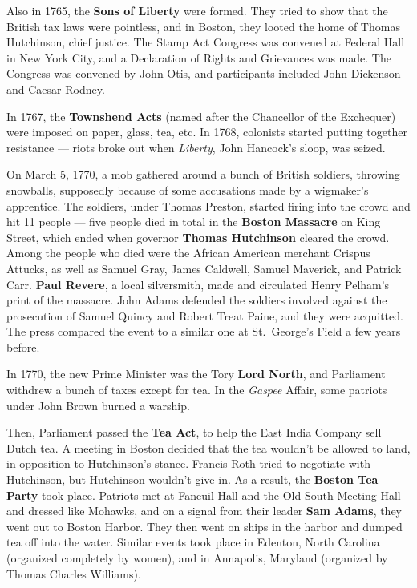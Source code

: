 Also in 1765, the \textbf{Sons of Liberty} were formed.
They tried to show that the British tax laws were pointless,
and in Boston, they looted the home of Thomas Hutchinson, chief justice.
The Stamp Act Congress was convened at Federal Hall in New York City,
and a Declaration of Rights and Grievances was made.
The Congress was convened by John Otis, and participants included John Dickenson and Caesar Rodney.

In 1767, the \textbf{Townshend Acts} (named after the Chancellor of the Exchequer)
were imposed on paper, glass, tea, etc.
In 1768, colonists started putting together resistance ---
riots broke out when \textit{Liberty}, John Hancock's sloop, was seized.

On March 5, 1770, a mob gathered around a bunch of British soldiers, throwing snowballs,
supposedly because of some accusations made by a wigmaker's apprentice.
The soldiers, under Thomas Preston, started firing into the crowd and hit 11 people ---
five people died in total in the \textbf{Boston Massacre} on King Street,
which ended when governor \textbf{Thomas Hutchinson} cleared the crowd.
Among the people who died were the African American merchant Crispus Attucks,
as well as Samuel Gray, James Caldwell, Samuel Maverick, and Patrick Carr.
\textbf{Paul Revere}, a local silversmith, made and circulated Henry Pelham's print of the massacre.
John Adams defended the soldiers involved against the prosecution of Samuel Quincy and Robert Treat Paine,
and they were acquitted.
The press compared the event to a similar one at St.\ George's Field a few years before.

In 1770, the new Prime Minister was the Tory \textbf{Lord North},
and Parliament withdrew a bunch of taxes except for tea.
In the \textit{Gaspee} Affair, some patriots under John Brown burned a warship.

Then, Parliament passed the \textbf{Tea Act}, to help the East India Company sell Dutch tea.
A meeting in Boston decided that the tea wouldn't be allowed to land,
in opposition to Hutchinson's stance.
Francis Roth tried to negotiate with Hutchinson, but Hutchinson wouldn't give in.
As a result, the \textbf{Boston Tea Party} took place.
Patriots met at Faneuil Hall and the Old South Meeting Hall and dressed like Mohawks,
and on a signal from their leader \textbf{Sam Adams}, they went out to Boston Harbor.
They then went on ships in the harbor and dumped tea off into the water.
Similar events took place in Edenton, North Carolina (organized completely by women),
and in Annapolis, Maryland (organized by Thomas Charles Williams).

